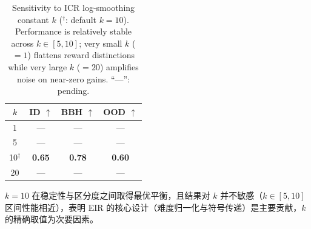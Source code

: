 \documentclass[11pt]{article}
\newcommand{\cdash}{---}                %
\begin{document}
\begin{table}[H]
  \centering
  \small
  \setlength{\tabcolsep}{6pt}
  \renewcommand{\arraystretch}{1.15}
  \begin{tabular}{cccc}
    \toprule
    $k$ & \textbf{ID} ${\uparrow}$ & \textbf{BBH} ${\uparrow}$ & \textbf{OOD} ${\uparrow}$ \\
    \midrule
    1           & \cdash & \cdash & \cdash \\
    5           & \cdash & \cdash & \cdash \\
    10$^\dagger$ & \textbf{0.65} & \textbf{0.78} & \textbf{0.60} \\
    20          & \cdash & \cdash & \cdash \\
    \bottomrule
  \end{tabular}
  \caption{Sensitivity to ICR log-smoothing constant $k$ ($^\dagger$: default $k{=}10$).
    Performance is relatively stable across $k \in [5, 10]$;
    very small $k$ ($=1$) flattens reward distinctions while very large $k$ ($=20$) amplifies noise on near-zero gains. ``\cdash'': pending.}
  \label{tab:icr_k}
\end{table}

$k{=}10$ 在稳定性与区分度之间取得最优平衡，且结果对 $k$ 并不敏感（$k \in [5, 10]$ 区间性能相近），表明 EIR 的核心设计（难度归一化与符号传递）是主要贡献，$k$ 的精确取值为次要因素。

\end{document}
